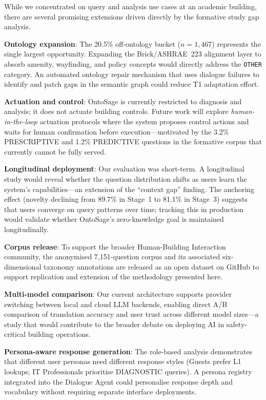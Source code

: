 \documentclass[acmsmall]{acmart}
\begin{document}
While we concentrated on query and analysis use cases at an academic building, there are several promising extensions driven directly by the formative study gap analysis.

\textbf{Ontology expansion}: The 20.5\% off-ontology bucket ($n=1{,}467$) represents the single largest opportunity. Expanding the Brick/ASHRAE~223 alignment layer to absorb amenity, wayfinding, and policy concepts would directly address the \texttt{OTHER} category. An automated ontology repair mechanism that uses dialogue failures to identify and patch gaps in the semantic graph could reduce T1 adaptation effort.

\textbf{Actuation and control}: OntoSage is currently restricted to diagnosis and analysis; it does not actuate building controls. Future work will explore \emph{human-in-the-loop} actuation protocols where the system proposes control actions and waits for human confirmation before execution---motivated by the 3.2\% PRESCRIPTIVE and 1.2\% PREDICTIVE questions in the formative corpus that currently cannot be fully served.

\textbf{Longitudinal deployment}: Our evaluation was short-term. A longitudinal study would reveal whether the question distribution shifts as users learn the system's capabilities---an extension of the ``context gap'' finding. The anchoring effect (novelty declining from 89.7\% in Stage~1 to 81.1\% in Stage~3) suggests that users converge on query patterns over time; tracking this in production would validate whether OntoSage's zero-knowledge goal is maintained longitudinally.

\textbf{Corpus release}: To support the broader Human-Building Interaction community, the anonymised 7{,}151-question corpus and its associated six-dimensional taxonomy annotations are released as an open dataset on GitHub to support replication and extension of the methodology presented here.

\textbf{Multi-model comparison}: Our current architecture supports provider switching between local and cloud LLM backends, enabling direct A/B comparison of translation accuracy and user trust across different model sizes---a study that would contribute to the broader debate on deploying AI in safety-critical building operations.

\textbf{Persona-aware response generation}: The role-based analysis demonstrates that different user personas need different response styles (Guests prefer L1 lookups; IT Professionals prioritise DIAGNOSTIC queries). A persona registry integrated into the Dialogue Agent could personalise response depth and vocabulary without requiring separate interface deployments.
\end{document}
